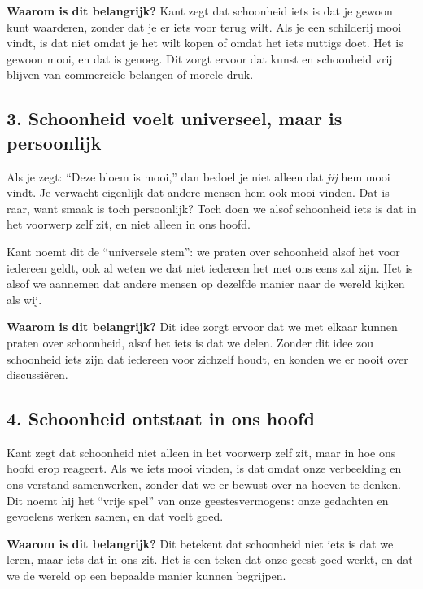 \documentclass[11pt, showtrims]{memoir}
\begin{document}
\smallskip

\textbf{Waarom is dit belangrijk?}
Kant zegt dat schoonheid iets is dat je gewoon kunt waarderen, zonder dat je er iets voor terug wilt. Als je een schilderij mooi vindt, is dat niet omdat je het wilt kopen of omdat het iets nuttigs doet. Het is gewoon mooi, en dat is genoeg. Dit zorgt ervoor dat kunst en schoonheid vrij blijven van commerciële belangen of morele druk.

\subsection*{3. Schoonheid voelt universeel, maar is persoonlijk}

Als je zegt: ``Deze bloem is mooi,'' dan bedoel je niet alleen dat \textit{jij} hem mooi vindt. Je verwacht eigenlijk dat andere mensen hem ook mooi vinden. Dat is raar, want smaak is toch persoonlijk? Toch doen we alsof schoonheid iets is dat in het voorwerp zelf zit, en niet alleen in ons hoofd.

Kant noemt dit de ``universele stem'': we praten over schoonheid alsof het voor iedereen geldt, ook al weten we dat niet iedereen het met ons eens zal zijn. Het is alsof we aannemen dat andere mensen op dezelfde manier naar de wereld kijken als wij.

\smallskip

\textbf{Waarom is dit belangrijk?}
Dit idee zorgt ervoor dat we met elkaar kunnen praten over schoonheid, alsof het iets is dat we delen. Zonder dit idee zou schoonheid iets zijn dat iedereen voor zichzelf houdt, en konden we er nooit over discussiëren.

\subsection*{4. Schoonheid ontstaat in ons hoofd}

Kant zegt dat schoonheid niet alleen in het voorwerp zelf zit, maar in hoe ons hoofd erop reageert. Als we iets mooi vinden, is dat omdat onze verbeelding en ons verstand samenwerken, zonder dat we er bewust over na hoeven te denken. Dit noemt hij het ``vrije spel'' van onze geestesvermogens: onze gedachten en gevoelens werken samen, en dat voelt goed.

\smallskip

\textbf{Waarom is dit belangrijk?}
Dit betekent dat schoonheid niet iets is dat we leren, maar iets dat in ons zit. Het is een teken dat onze geest goed werkt, en dat we de wereld op een bepaalde manier kunnen begrijpen.
\end{document}
